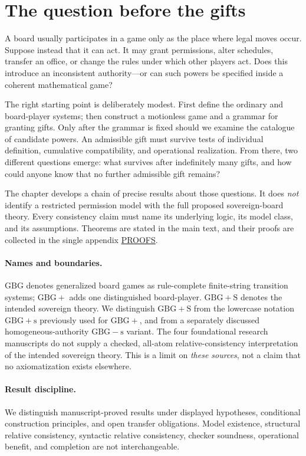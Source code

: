 \documentclass[11pt,letterpaper]{article}
\theoremstyle{definition}\newtheorem{definition}[theorem]{Definition}\newtheorem{example}[theorem]{Example}
\theoremstyle{remark}\newtheorem{remark}[theorem]{Remark}
\begin{document}
\begingroup\small\setlength{\parskip}{0pt}\tableofcontents\endgroup
\newpage
\section{The question before the gifts}\label{sec:question}
A board usually participates in a game only as the place where legal moves
occur. Suppose instead that it can act. It may grant permissions, alter
schedules, transfer an office, or change the rules under which other players
act. Does this introduce an inconsistent authority---or can such powers be
specified inside a coherent mathematical game?

The right starting point is deliberately modest. First define the ordinary
and board-player systems; then construct a motionless game and a grammar
for granting gifts. Only after the grammar is fixed should we examine the
catalogue of candidate powers. An admissible gift must survive tests of
individual definition, cumulative compatibility, and operational realization.
From there, two different questions emerge: what survives after indefinitely
many gifts, and how could anyone know that no further admissible gift remains?

The chapter develops a chain of precise results about those questions. It
does \emph{not} identify a restricted permission model with the full proposed
sovereign-board theory. Every consistency claim must name its underlying
logic, its model class, and its assumptions. Theorems are stated in the main
text, and their proofs are collected in the single appendix \hyperref[sec:all-proofs]{PROOFS}.

\paragraph{Names and boundaries.}
$\mathrm{GBG}$ denotes generalized board games as rule-complete finite-string
transition systems; $\mathrm{GBG+}$ adds one distinguished board-player.
$\mathrm{GBG+S}$ denotes the intended sovereign theory. We distinguish
$\mathrm{GBG+S}$ from the lowercase notation $\mathrm{GBG+s}$ previously used
for $\mathrm{GBG+}$, and from a separately discussed homogeneous-authority
$\mathrm{GBG-s}$ variant. The four foundational research manuscripts do not
supply a checked, all-atom relative-consistency interpretation of the intended
sovereign theory. This is a limit on \emph{these sources}, not a claim that no
axiomatization exists elsewhere.

\paragraph{Result discipline.}
We distinguish manuscript-proved results under displayed hypotheses,
conditional construction principles, and open transfer obligations.
Model existence, structural relative consistency, syntactic relative
consistency, checker soundness, operational benefit, and completion are
not interchangeable.
\end{document}

